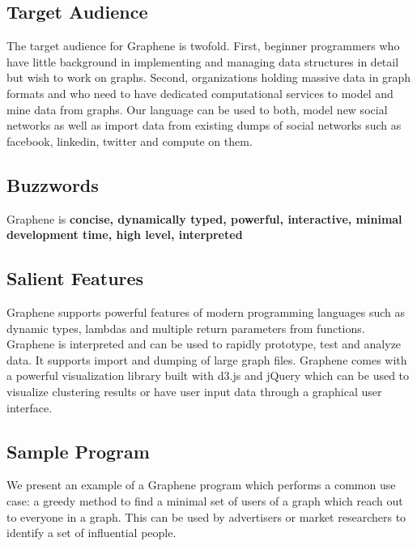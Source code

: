\documentclass[a4paper]{article}
\begin{document}
\subsection{Target Audience}
The target audience for Graphene is twofold. First, beginner programmers who have little background in implementing and managing data structures in detail but wish to work on graphs. Second, organizations holding massive data in graph formats and who need to have dedicated computational services to model and mine data from graphs. Our language can be used to both, model new social networks as well as import data from existing dumps of social networks such as facebook, linkedin, twitter and compute on them.
\newline

\subsection{Buzzwords}
Graphene is \textbf{concise, dynamically typed, powerful, interactive, minimal development time, high level, interpreted}
\newline

\subsection{Salient Features}
Graphene supports powerful features of modern programming languages such as dynamic types, lambdas and multiple return parameters from functions. Graphene is interpreted and can be used to rapidly prototype, test and analyze data. It supports import and dumping of large graph files. Graphene comes with a powerful visualization library built with d3.js and jQuery which can be used to visualize clustering results or have user input data through a graphical user interface.

\subsection{Sample Program}
We present an example of a Graphene program which performs a common use case: a greedy method to find a minimal set of users of a graph which reach out to everyone in a graph. This can be used by advertisers or market researchers to identify a set of influential people.
\end{document}
